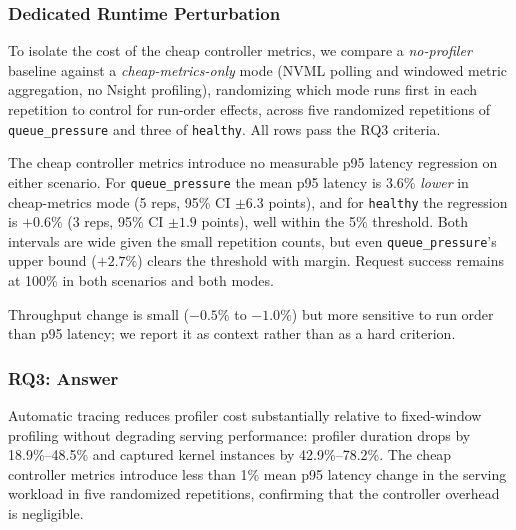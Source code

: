 \subsubsection{Dedicated Runtime Perturbation}

To isolate the cost of the cheap controller metrics, we compare a \emph{no-profiler} baseline against a \emph{cheap-metrics-only} mode (NVML polling and windowed metric aggregation, no Nsight profiling), randomizing which mode runs first in each repetition to control for run-order effects, across five randomized repetitions of \texttt{queue\_pressure} and three of \texttt{healthy}. All rows pass the RQ3 criteria.

The cheap controller metrics introduce no measurable p95 latency regression on either scenario. For \texttt{queue\_pressure} the mean p95 latency is 3.6\% \emph{lower} in cheap-metrics mode (5 reps, 95\% CI $\pm 6.3$ points), and for \texttt{healthy} the regression is $+0.6\%$ (3 reps, 95\% CI $\pm 1.9$ points), well within the 5\% threshold. Both intervals are wide given the small repetition counts, but even \texttt{queue\_pressure}'s upper bound ($+2.7\%$) clears the threshold with margin. Request success remains at 100\% in both scenarios and both modes.

Throughput change is small ($-0.5\%$ to $-1.0\%$) but more sensitive to run order than p95 latency; we report it as context rather than as a hard criterion.

\subsubsection{RQ3: Answer}

Automatic tracing reduces profiler cost substantially relative to fixed-window profiling without degrading serving performance: profiler duration drops by 18.9\%--48.5\% and captured kernel instances by 42.9\%--78.2\%. The cheap controller metrics introduce less than 1\% mean p95 latency change in the serving workload in five randomized repetitions, confirming that the controller overhead is negligible.
